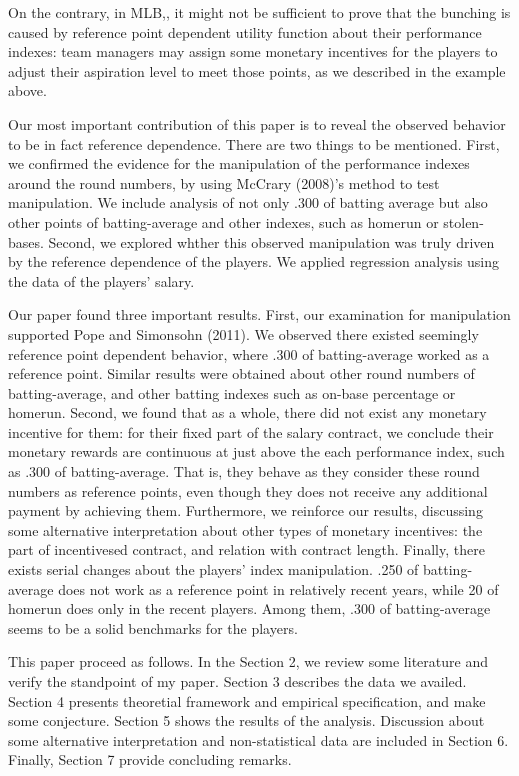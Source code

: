 \documentclass[dvipdfmx, 12pt]{article}
\begin{document}
On the contrary, in MLB,, it might not be sufficient to prove that the bunching is caused by reference point dependent utility function about their performance indexes: team managers may assign some monetary incentives for the players to adjust their aspiration level to meet those points, as we described in the example above.

Our most important contribution of this paper is to reveal the observed behavior to be in fact reference dependence. There are two things to be mentioned. First, we confirmed the evidence for the manipulation of the performance indexes around the round numbers, by using McCrary (2008)'s method to test manipulation. We include analysis of not only .300 of batting average but also other points of batting-average and other indexes, such as homerun or stolen-bases. Second, we explored whther this observed manipulation was truly driven by the reference dependence of the players. We applied regression analysis using the data of the players' salary.

Our paper found three important results. First, our examination for manipulation supported Pope and Simonsohn (2011). We observed there  existed seemingly reference point dependent behavior, where .300 of batting-average worked as a reference point. Similar results were obtained about other round numbers of batting-average, and other batting indexes such as on-base percentage or homerun. Second, we found that as a whole, there did not exist any monetary incentive for them: for their fixed part of the salary contract, we conclude their monetary rewards are continuous at just above the each performance index, such as .300 of batting-average. That is, they behave as they consider these round numbers as reference points, even though they does not receive any additional payment by achieving them. Furthermore, we reinforce our results, discussing some alternative interpretation about other types of monetary incentives: the part of incentivesed contract, and relation with contract length. Finally, there exists serial changes about the players' index manipulation. .250 of batting-average does not work as a reference point in relatively recent years, while 20 of homerun does only in the recent players. Among them, .300 of batting-average seems to be a solid benchmarks for the players.

This paper proceed as follows. In the Section 2, we review some literature and verify the standpoint of my paper. Section 3 describes the data we availed. Section 4 presents theoretial framework and empirical  specification, and make some conjecture.  Section 5 shows the results of the analysis. Discussion about some alternative interpretation and non-statistical data are included in Section 6. Finally, Section 7 provide concluding remarks.
\end{document}
